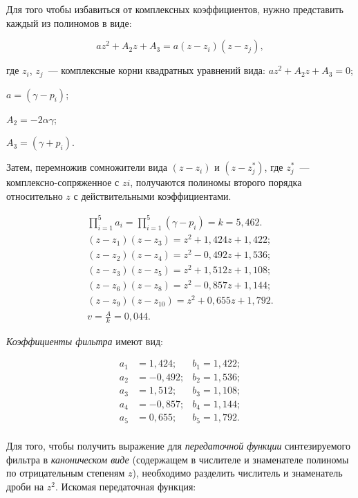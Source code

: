 \point Для того чтобы избавиться от комплексных коэффициентов, нужно
представить каждый из полиномов в виде:

\begin{equation*}
  az^2 + A_2z + A_3 = a(z-z_i)(z-z_j),
\end{equation*}

\begin{ESKDexplanation}
\item[где ] $z_i$, $z_j$~--- комплексные корни квадратных уравнений
  вида: $az^2 + A_2z + A_3 = 0$;
\item $a = (\gamma - p_i)$;
\item $A_2 = - 2 \alpha \gamma$;
\item $A_3 = (\gamma + p_i)$.
\end{ESKDexplanation}

Затем, перемножив сомножители вида $(z - z_i)$ и $(z- z_j^*)$, где
$z_j^*$~--- комплексно-сопряженное с $zi$, получаются полиномы второго
порядка относительно $z$ с действительными коэффициентами.

\begin{gather*}
  \prod_{i=1}^{5}a_i = \prod_{i=1}^{5}(\gamma - p_i) = k = 5{,}462.\\
  (z - z_1)(z - z_3)   = z^2 + 1{,}424z + 1{,}422;\\
  (z - z_2)(z - z_4)   = z^2 - 0{,}492z + 1{,}536;\\
  (z - z_3)(z - z_5)   = z^2 + 1{,}512z + 1{,}108;\\
  (z - z_6)(z - z_8)   = z^2 - 0{,}857z + 1{,}144;\\
  (z - z_9)(z - z_{10}) = z^2 + 0{,}655z + 1{,}792.\\
  v = \frac{A}{k} = 0{,}044.
\end{gather*}

\textit{Коэффициенты фильтра} имеют вид:

\begin{align*}
  a_1& =    1{,}424; & b_1 =  1{,}422;\\ 
  a_2& =  - 0{,}492; & b_2 =  1{,}536;\\ 
  a_3& =    1{,}512; & b_3 =  1{,}108;\\ 
  a_4& =  - 0{,}857; & b_4 =  1{,}144;\\ 
  a_5& =    0{,}655; & b_5 =  1{,}792.\\ 
\end{align*}

\point Для того, чтобы получить выражение для \textit{передаточной
  функции} синтезируемого фильтра в \emph{каноническом виде}
(содержащем в числителе и знаменателе полиномы по отрицательным
степеням $z$), необходимо разделить числитель и знаменатель дроби на
$z^2$. Искомая передаточная функция:

